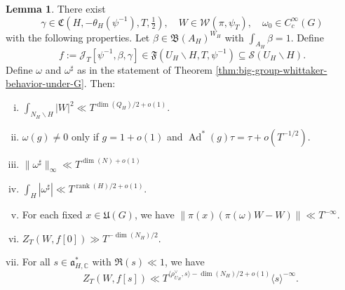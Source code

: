 \documentclass[reqno]{amsart}
\DeclareMathOperator{\Ad}{Ad}
\def\eps{\varepsilon}
\DeclareMathOperator{\trace}{trace}
\DeclareMathOperator{\rank}{rank}
\theoremstyle{plain} \newtheorem{theorem} {Theorem}
\theoremstyle{definition} \newtheorem{definition} [theorem] {Definition}
\theoremstyle{itplain} %
\newtheorem{lemma}[theorem]{Lemma}
\numberwithin{equation}{section}
\numberwithin{theorem}{section}
\begin{document}
\begin{lemma}\label{lem:there-exists-begin}
  There exist
  \begin{equation*}
    \gamma \in \mathfrak{C}(H, -\theta_H(\psi^{-1}), T, \tfrac{1}{2}),
    \quad
    W \in \mathcal{W}(\pi,\psi_T),
    \quad
    \omega_0 \in C_c^\infty(G)
  \end{equation*}
  with the following properties.  Let $\beta \in \mathfrak{B}(A_H)^{W_H}$ with $\int_{A_H} \beta  = 1$.  Define
  \begin{equation*}
    f := \mathcal{J}_T[\psi^{-1},\beta,\gamma] \in \mathfrak{F}(U_H \backslash H, T, \psi^{-1}) \subseteq \mathcal{S}(U_H \backslash H).
  \end{equation*}
  Define $\omega$ and $\omega ^\sharp$ as in the statement of Theorem \ref{thm:big-group-whittaker-behavior-under-G}.  Then:
  \begin{enumerate}[(i)]
  \item \label{item:lemma-there-exists-gamma-W-1} $\int_{N_H \backslash H} |W|^2 \ll T^{\dim(Q_H) / 2 + o(1)}$.
  \item \label{itm:lemma-exists-omega-2}  $\omega(g) \neq 0$ only if $g = 1 + o(1)$ and $\Ad^*(g) \tau = \tau + o(T^{-1/2})$.
  \item  \label{itm:lemma-exists-omega-3} $\|\omega^\sharp\|_{\infty} \ll T^{\dim(N)+o(1)}$
  \item $\int_H |\omega^\sharp| \ll T^{\rank(H)/2 + o(1)}$.
  \item \label{item:lemma-there-exists-gamma-W-5} For each fixed $x \in \mathfrak{U}(G)$, we have $\|\pi(x) (\pi(\omega)W - W)\| \ll T^{-\infty}$.
  \item \label{item:lemma-there-exists-gamma-W-6}  $Z_T(W,f[0]) \gg T^{-\dim(N_H)/2}$.
  \item \label{item:lemma-there-exists-gamma-W-7} For all $s \in \mathfrak{a}_{H,\mathbb{C}}^*$ with $\Re(s) \ll 1$, we have
    \begin{equation*}
Z_T(W,f[s]) \ll T^{\langle \rho_{U_H}^\vee, s \rangle - \dim(N_H)/2 + o(1)} \langle s \rangle^{-\infty}.
\end{equation*}
  \end{enumerate}
\end{lemma}
\end{document}
